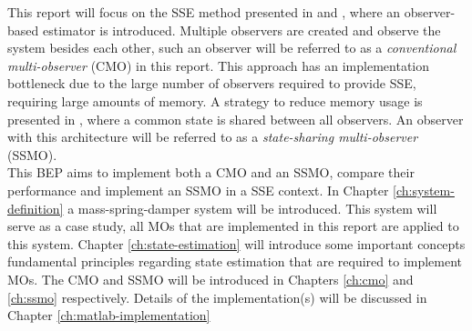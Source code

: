 This report will focus on the SSE method presented in \cite{Chong2015ObservabilityAttacks} and \cite{Chong2020AAttacks}, where an observer-based estimator is introduced. Multiple observers are created and observe the system besides each other, such an observer will be referred to as a \textit{conventional multi-observer} (CMO) in this report. This approach has an implementation bottleneck due to the large number of observers required to provide SSE, requiring large amounts of memory. A strategy to reduce memory usage is presented in \cite{Chong2023MemoryAlgorithms}, where a common state is shared between all observers. An observer with this architecture will be referred to as a \textit{state-sharing multi-observer} (SSMO). \\

This BEP aims to implement both a CMO and an SSMO, compare their performance and implement an SSMO in a SSE context. In Chapter \ref{ch:system-definition} a mass-spring-damper system will be introduced. This system will serve as a case study, all MOs that are implemented in this report are applied to this system. Chapter \ref{ch:state-estimation} will introduce some important concepts fundamental principles regarding state estimation that are required to implement MOs. The CMO and SSMO will be introduced in Chapters \ref{ch:cmo} and \ref{ch:ssmo} respectively. Details of the implementation(s) will be discussed in Chapter \ref{ch:matlab-implementation}
